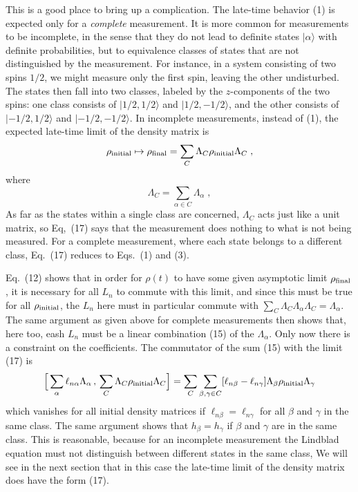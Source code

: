 This is a good place to bring up a complication.  The late-time behavior (1) is expected only for a {\em complete} measurement.  It is more common for measurements to be incomplete, in the sense that they do not lead to definite states $|\alpha\rangle$ with definite probabilities, but to equivalence classes of  states that are not distinguished by the measurement.  For instance, in a system consisting of two spins $1/2$, we might measure only the first spin, leaving the other undisturbed.  The states then fall into two classes, labeled by the $z$-components of the two spins: one class consists of $|1/2,1/2\rangle$ and  $|1/2,-1/2\rangle$, and the other consists of $|-1/2,1/2\rangle$ and  $|-1/2,-1/2\rangle$.  In incomplete measurements, instead of (1), the expected late-time limit of the density matrix is
\begin{equation}
\rho_{\rm initial}\mapsto\rho_{\rm final}=\sum_C \Lambda_C\rho_{\rm initial}\Lambda_C \;,
\end{equation}
where 
\begin{equation}
\Lambda_C=\sum_{\alpha\in C}\Lambda_\alpha\;,
\end{equation}
As far as the states within a single class are concerned, $\Lambda_C$ acts just like a unit matrix, so Eq,~(17) says that the measurement does nothing to what is not being measured.   For a complete measurement, where each  state belongs to a different class, Eq.~(17) reduces to Eqs.~(1) and (3).

 Eq.~(12) shows that in order for $\rho(t)$ to have some given asymptotic limit $\rho_{\rm final}$, it is necessary  for all $L_n$ to commute with 
this limit, and since this must be true for all $\rho_{\rm initial}$, the $L_n$ here must in particular commute with $\sum_C\Lambda_C\Lambda_\alpha\Lambda_C=\Lambda_\alpha$.  The same argument as given above for complete measurements then shows that, here too, eash $L_n$ must be a linear combination (15) of the $\Lambda_\alpha$.  Only now there is a constraint on the coefficients.  The commutator of the sum (15) with the limit (17) is 
$$ \Big[\sum_\alpha \ell_{n\alpha} \Lambda_\alpha\,,\,\sum_C \Lambda_C\rho_{\rm initial}\Lambda_C\Big]
=\sum_C\sum_{\beta,\gamma\in C}[\ell_{n\beta}-\ell_{n\gamma}]\Lambda_\beta\rho_{\rm initial}\Lambda_\gamma$$
which vanishes for all initial density matrices if $\ell_{n\beta}=\ell_{n\gamma}$ for all $\beta$ and $\gamma$ in the same class.  The same argument shows that $h_\beta=h_\gamma$ if $\beta$ and $\gamma$ are in the same class.
This is reasonable, because for an incomplete measurement the Lindblad equation must not distinguish between different states in the same class,  We will see in the next section that in this case 
the late-time limit of the density matrix does have the form (17).

